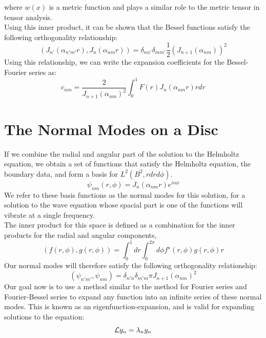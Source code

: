 \documentclass{article}
\begin{document}
where $w(x)$ is a metric function and plays a similar role to the metric tensor in tensor analysis.\\
Using this inner product, it can be shown that the Bessel functions satisfy the following orthogonality relationship:
\begin{equation}
  \boxed{
    \left(J_{n'}(\alpha_{n'm'}r),J_{n}(\alpha_{nm}r)\right) =\delta_{nn'}\delta_{mm'}\frac{1}{2}(J_{n+1}(\alpha_{nm}))^2
  }
\end{equation}
Using this relationship, we can write the expansion coefficients for the Bessel-Fourier series as:
\begin{equation}
  \boxed{
    c_{nm} = \frac{2}{J_{n+1}(\alpha_{nm})^2}\int_0^1 F(r)J_n(\alpha_{nm}r) rdr
  }
\end{equation}
\section{The Normal Modes on a Disc}
If we combine the radial and angular part of the solution to the Helmholtz equation, we obtain a set of functions that satisfy the Helmholtz equation, the boundary data, and form a basis for $L^2(B^2,rdrd\phi)$. 
\begin{equation}
  \boxed{
    \psi_{nm}(r,\phi) = J_n ( \alpha_{nm} r) e^{i n \phi}
  }
\end{equation}
We refer to these basis functions as the normal modes for this solution, for a solution to the wave equation whose spacial part is one of the functions will vibrate at a single frequency.\\
The inner product for this space is defined as a combination for the inner products for the radial and angular components,
\begin{equation}
  \boxed{
    \left(f(r,\phi),g(r,\phi)\right) = \int_0 ^1 dr \int_0 ^{2\pi} d\phi f^\star(r,\phi) g(r,\phi) r
  }
\end{equation}
Our normal modes will therefore satisfy the following orthogonality relationship:
\begin{equation}
  (\psi_{n'm'},\psi_{nm}) = \delta_{n'n}\delta_{m'm} \pi J_{n+1}( \alpha_{nm } )^2
\end{equation}
Our goal now is to use a method similar to the method for Fourier series and Fourier-Bessel series to expand any function into an infinite series of these normal modes. This is known as an eigenfunction-expansion, and is valid for expanding solutions to the equation:
\begin{equation}
  \mathcal{L} y_n = \lambda_n y_n
\end{equation}
\end{document}
